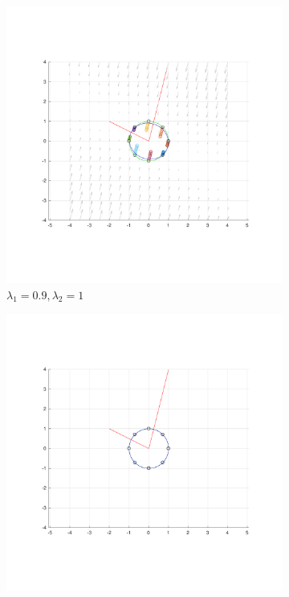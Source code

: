 \documentclass[]{article}
\begin{document}
\begin{figure}[H]
	
	\centering
	\begin{subfigure}{.5\textwidth}
		\centering
		\includegraphics[width=0.99\linewidth]{const2_9}
		\caption{$\lambda_1 = 0.9, \lambda_2 = 1 $}
		\label{fig:const21}
	\end{subfigure}
	\begin{subfigure}{.5\textwidth}
		\centering
		\includegraphics[width=0.99\linewidth]{const2_1}

\end{subfigure}
\end{figure}
\end{document}
